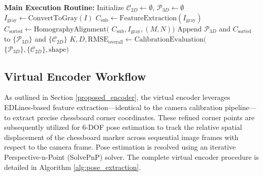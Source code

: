 \begin{algorithm}[t]
\begin{algorithmic}[1]
\Statex
\textbf{Main Execution Routine:}
\State Initialize $\mathcal{C}_{2D} \gets \emptyset$, $\mathcal{P}_{3D} \gets \emptyset$
    \State $I_{\text{gray}} \gets \text{ConvertToGray}(I)$
    \State $C_{\text{sub}} \gets \text{FeatureExtraction}(I_{\text{gray}})$
    \State $C_{\text{sorted}} \gets \text{HomographyAlignment}($
    \Statex \hspace{5.5em} $C_{\text{sub}}, I_{\text{gray}}, (M, N))$
        \State Append $\mathcal{P}_{3D}$ and $C_{\text{sorted}}$ to $\{\mathcal{P}_{3D}\}$ and $\{\mathcal{C}_{2D}\}$
    \EndIf
\EndFor
\State $K, D, \text{RMSE}_{\text{overall}} \gets \text{CalibrationEvaluation}($
\Statex \hspace{4em} $\{\mathcal{P}_{3D}\}, \{\mathcal{C}_{2D}\}, \text{shape})$

\end{algorithmic}
\end{algorithm}



\subsection{Virtual Encoder Workflow}
As outlined in Section \ref{proposed_encoder}, the virtual encoder leverages EDLines-based feature extraction—identical to the camera calibration pipeline—to extract precise chessboard corner coordinates. These refined corner points are subsequently utilized for 6-DOF pose estimation to track the relative spatial displacement of the chessboard marker across sequential image frames with respect to the camera frame. Pose estimation is resolved using an iterative Perspective-n-Point (SolvePnP) solver. The complete virtual encoder procedure is detailed in Algorithm \ref{alg:pose_extraction}.

